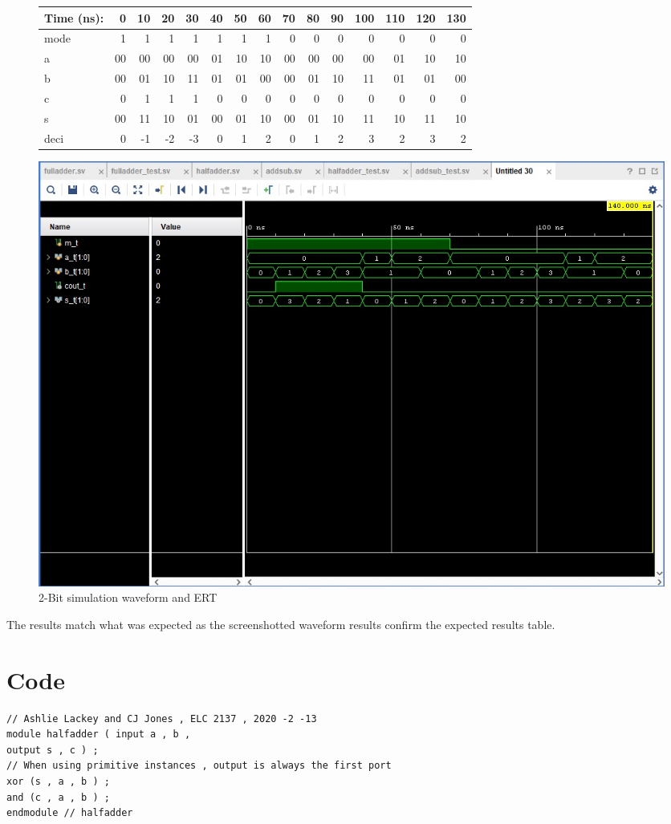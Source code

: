 \documentclass[11pt]{article}
\begin{document}
\begin{figure}[ht]\centering
	\begin{tabular}{l|rrrrrrrrrrrrrr}
		Time (ns): & 0 & 10 & 20 & 30 & 40 & 50 & 60 & 70 & 80 & 90 & 100 & 110 & 120 & 130 \\
		\midrule 
		mode & 1 & 1 & 1 & 1 & 1 & 1 & 1 & 0 & 0 & 0 & 0 & 0 & 0 & 0 \\ 
		a & 00 & 00 & 00 & 00 & 01 & 10 & 10 & 00 & 00 & 00 & 00 & 01 & 10 & 10 \\
		b & 00 & 01 & 10 & 11 & 01 & 01 & 00 & 00 & 01 & 10 & 11 & 01 & 01 & 00\\
		\midrule
		c & 0 & 1 & 1 & 1 & 0 & 0 & 0 & 0 & 0 & 0 & 0 & 0 & 0 & 0 \\
		s & 00 & 11 & 10 & 01 & 00 & 01 & 10 & 00 & 01 & 10 & 11 & 10 & 11 & 10 \\
		deci & 0 & -1 & -2 & -3 & 0 & 1 & 2 & 0 & 1 & 2 & 3 & 2 & 3 & 2 \\
		\bottomrule
	\end{tabular}\medskip
	
	\includegraphics[width=1.0\textwidth]{AddSubReal}
	\caption{2-Bit simulation waveform and ERT}
	\label{fig:sim_with_table}
\end{figure}

\clearpage

The results match what was expected as the screenshotted waveform results confirm the expected results table. 
\section*{Code}
\begin{lstlisting}[style=Verilog,caption=Half Adder Design Code,label=code:ex ]
// Ashlie Lackey and CJ Jones , ELC 2137 , 2020 -2 -13
module halfadder ( input a , b ,
output s , c ) ;
// When using primitive instances , output is always the first port
xor (s , a , b ) ;
and (c , a , b ) ;
endmodule // halfadder

\end{lstlisting}
\end{document}
